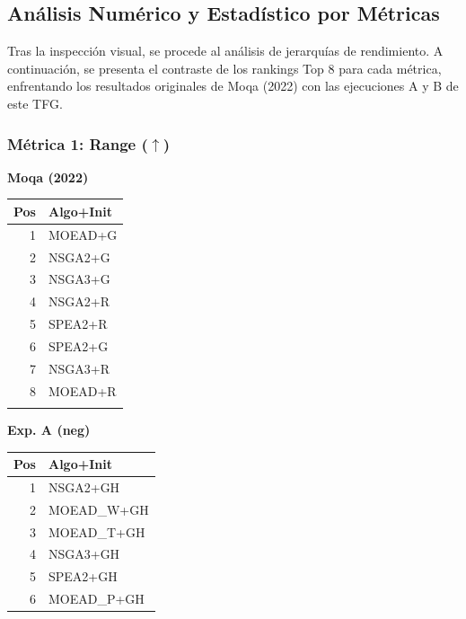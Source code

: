 \documentclass[a4paper,10pt]{article}
\begin{document}
\subsection{Análisis Numérico y Estadístico por Métricas}
Tras la inspección visual, se procede al análisis de jerarquías de rendimiento. A continuación, se presenta el contraste de los rankings Top 8 para cada métrica, enfrentando los resultados originales de Moqa (2022) con las ejecuciones A y B de este TFG.

\subsubsection{Métrica 1: Range \texorpdfstring{($\uparrow$)}{(up)}}
\begin{table}[H]
    \centering
    \begin{minipage}[t]{0.32\textwidth}
        \centering\scriptsize\textbf{Moqa (2022)}\\
        \begin{tabular}{rl}
            \toprule
            Pos & Algo+Init \\ \midrule
            1 & MOEAD+G \\
            2 & NSGA2+G \\
            3 & NSGA3+G \\
            4 & NSGA2+R \\
            5 & SPEA2+R \\
            6 & SPEA2+G \\
            7 & NSGA3+R \\
            8 & MOEAD+R \\
            \\
            \bottomrule
        \end{tabular}
    \end{minipage}
    \hfill
    \begin{minipage}[t]{0.32\textwidth}
        \centering\scriptsize\textbf{Exp. A (neg)}\\
        \begin{tabular}{rl}
            \toprule
            Pos & Algo+Init \\ \midrule
            1 & NSGA2+GH \\
            2 & MOEAD\_W+GH \\
            3 & MOEAD\_T+GH \\
            4 & NSGA3+GH \\
            5 & SPEA2+GH \\
            6 & MOEAD\_P+GH \\

\end{tabular}
\end{minipage}
\end{table}
\end{document}
